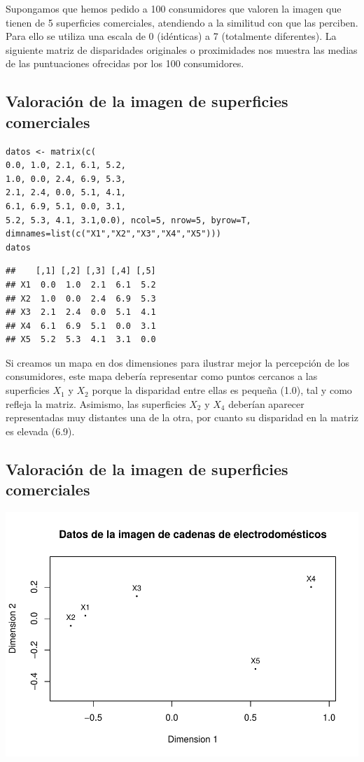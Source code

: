 \documentclass[]{article}
\begin{document}
\hypertarget{right}{}
Supongamos que hemos pedido a {100 consumidores} que valoren la {imagen
que tienen de 5 superficies comerciales}, atendiendo a la similitud con
que las perciben. Para ello se utiliza una {escala de 0 (idénticas) a 7
(totalmente diferentes)}. La siguiente {matriz de disparidades
originales o proximidades} nos muestra las {medias de las puntuaciones}
ofrecidas por los 100 consumidores.

\subsection{Valoración de la imagen de superficies
comerciales}\label{valoraciuxf3n-de-la-imagen-de-superficies-comerciales-1}

\hypertarget{left}{}
\begin{verbatim}
datos <- matrix(c(
0.0, 1.0, 2.1, 6.1, 5.2,
1.0, 0.0, 2.4, 6.9, 5.3,
2.1, 2.4, 0.0, 5.1, 4.1,
6.1, 6.9, 5.1, 0.0, 3.1,
5.2, 5.3, 4.1, 3.1,0.0), ncol=5, nrow=5, byrow=T,
dimnames=list(c("X1","X2","X3","X4","X5")))
datos
\end{verbatim}

\begin{verbatim}
##    [,1] [,2] [,3] [,4] [,5]
## X1  0.0  1.0  2.1  6.1  5.2
## X2  1.0  0.0  2.4  6.9  5.3
## X3  2.1  2.4  0.0  5.1  4.1
## X4  6.1  6.9  5.1  0.0  3.1
## X5  5.2  5.3  4.1  3.1  0.0
\end{verbatim}

\hypertarget{right}{}
Si creamos un {mapa en dos dimensiones} para ilustrar mejor la
percepción de los consumidores, este mapa debería representar como
{puntos cercanos a las superficies \(X_1\) y \(X_2\)} porque la
{disparidad} entre ellas es{ pequeña (1.0)}, tal y como refleja la
matriz. Asimismo, las {superficies \(X_2\) y \(X_4\)} deberían aparecer
representadas muy {distantes} una de la otra, por cuanto su {disparidad}
en la matriz es {elevada (6.9)}.

\subsection{Valoración de la imagen de superficies
comerciales}\label{valoraciuxf3n-de-la-imagen-de-superficies-comerciales-2}

\hypertarget{left}{}
\includegraphics{Clase-4_files/figure-latex/unnamed-chunk-3-1.pdf}
\end{document}

